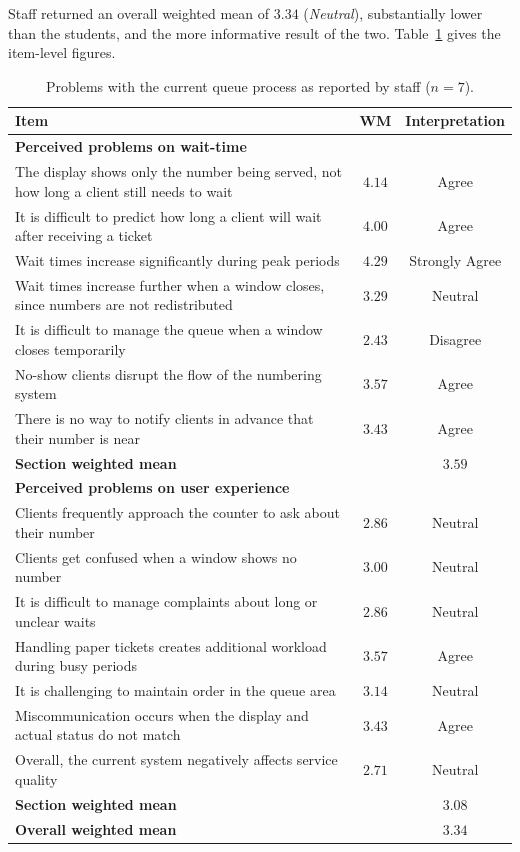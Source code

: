 \documentclass{research}
\begin{document}
\label{subsec:sop1-staff}

Staff returned an overall weighted mean of $3.34$ (\emph{Neutral}),
substantially lower than the students, and the more informative result
of the two. Table~\ref{tab:sop1-staff} gives the item-level figures.

\begin{table}[!tbp]
\centering
\caption{Problems with the current queue process as reported by staff
($n = 7$).}
\label{tab:sop1-staff}
\begin{tabular}{p{}cc}
\hline
Item & WM & Interpretation \\
\hline
\multicolumn{3}{l}{\textbf{Perceived problems on wait-time}} \\
The display shows only the number being served, not how long a client
  still needs to wait & $4.14$ & Agree \\
It is difficult to predict how long a client will wait after receiving
  a ticket & $4.00$ & Agree \\
Wait times increase significantly during peak periods & $4.29$ & Strongly Agree \\
Wait times increase further when a window closes, since numbers are not
  redistributed & $3.29$ & Neutral \\
It is difficult to manage the queue when a window closes temporarily & $2.43$ & Disagree \\
No-show clients disrupt the flow of the numbering system & $3.57$ & Agree \\
There is no way to notify clients in advance that their number is near & $3.43$ & Agree \\
\hline
\multicolumn{2}{l}{\textbf{Section weighted mean}} & $3.59$ \\
\hline
\multicolumn{3}{l}{\textbf{Perceived problems on user experience}} \\
Clients frequently approach the counter to ask about their number & $2.86$ & Neutral \\
Clients get confused when a window shows no number & $3.00$ & Neutral \\
It is difficult to manage complaints about long or unclear waits & $2.86$ & Neutral \\
Handling paper tickets creates additional workload during busy periods & $3.57$ & Agree \\
It is challenging to maintain order in the queue area & $3.14$ & Neutral \\
Miscommunication occurs when the display and actual status do not match & $3.43$ & Agree \\
Overall, the current system negatively affects service quality & $2.71$ & Neutral \\
\hline
\multicolumn{2}{l}{\textbf{Section weighted mean}} & $3.08$ \\
\hline
\multicolumn{2}{l}{\textbf{Overall weighted mean}} & $\mathbf{3.34}$ \\
\hline
\end{tabular}
\end{table}
\end{document}
